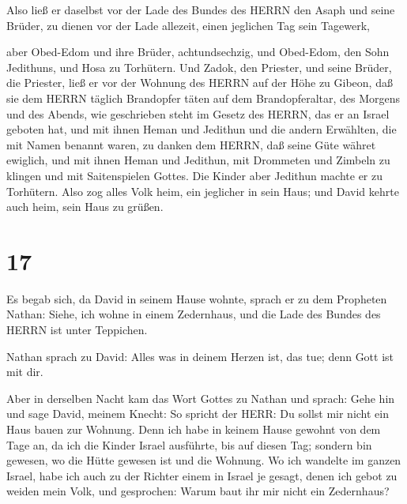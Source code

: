  Also ließ er daselbst vor der Lade des Bundes des HERRN
den Asaph und seine Brüder, zu dienen vor der Lade allezeit, einen
jeglichen Tag sein Tagewerk,

 aber Obed-Edom und ihre Brüder, achtundsechzig, und
Obed-Edom, den Sohn Jedithuns, und Hosa zu Torhütern.  Und
Zadok, den Priester, und seine Brüder, die Priester, ließ er vor der
Wohnung des HERRN auf der Höhe zu Gibeon,  daß sie dem
HERRN täglich Brandopfer täten auf dem Brandopferaltar, des Morgens und
des Abends, wie geschrieben steht im Gesetz des HERRN, das er an Israel
geboten hat,  und mit ihnen Heman und Jedithun und die
andern Erwählten, die mit Namen benannt waren, zu danken dem HERRN, daß
seine Güte währet ewiglich,  und mit ihnen Heman und
Jedithun, mit Drommeten und Zimbeln zu klingen und mit Saitenspielen
Gottes. Die Kinder aber Jedithun machte er zu Torhütern. 
Also zog alles Volk heim, ein jeglicher in sein Haus; und David kehrte
auch heim, sein Haus zu grüßen.

\hypertarget{section-16}{%
\section{17}\label{section-16}}

 Es begab sich, da David in seinem Hause wohnte, sprach er
zu dem Propheten Nathan: Siehe, ich wohne in einem Zedernhaus, und die
Lade des Bundes des HERRN ist unter Teppichen.

 Nathan sprach zu David: Alles was in deinem Herzen ist, das
tue; denn Gott ist mit dir.

 Aber in derselben Nacht kam das Wort Gottes zu Nathan und
sprach:  Gehe hin und sage David, meinem Knecht: So spricht
der HERR: Du sollst mir nicht ein Haus bauen zur Wohnung. 
Denn ich habe in keinem Hause gewohnt von dem Tage an, da ich die Kinder
Israel ausführte, bis auf diesen Tag; sondern bin gewesen, wo die Hütte
gewesen ist und die Wohnung.  Wo ich wandelte im ganzen
Israel, habe ich auch zu der Richter einem in Israel je gesagt, denen
ich gebot zu weiden mein Volk, und gesprochen: Warum baut ihr mir nicht
ein Zedernhaus?

